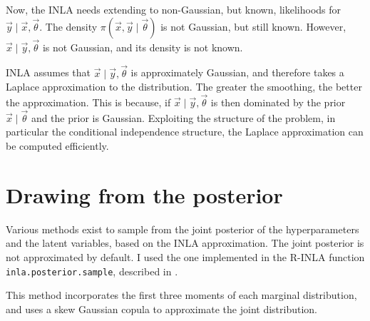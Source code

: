 \documentclass[thesis.tex]{subfiles}
\begin{document}
Now, the INLA needs extending to non-Gaussian, but known, likelihoods for $\vec{y} \mid \vec{x}, \vec{\theta}$.
The density $\pi(\vec{x}, \vec{y} \mid \vec{\theta})$ is not Gaussian, but still known.
However, $\vec{x} \mid \vec{y}, \vec{\theta}$ is not Gaussian, and its density is not known.

INLA assumes that $\vec{x} \mid \vec{y}, \vec{\theta}$ is approximately Gaussian, and therefore takes a Laplace approximation to the distribution.
The greater the smoothing, the better the approximation.
This is because, if $\vec{x} \mid \vec{y}, \vec{\theta}$ is then dominated by the prior $\vec{x} \mid \vec{\theta}$ and the prior is Gaussian.
Exploiting the structure of the problem, in particular the conditional independence structure, the Laplace approximation can be computed efficiently.

\section{Drawing from the posterior} \label{transmission:sec:INLA:posterior}

Various methods exist to sample from the joint posterior of the hyperparameters and the latent variables, based on the INLA approximation.
The joint posterior is not approximated by default.
I used the one implemented in the R-INLA function \texttt{inla.posterior.sample}, described in \textcite[section 4]{chiuchioloJoint}.

This method incorporates the first three moments of each marginal distribution, and uses a skew Gaussian copula to approximate the joint distribution.
\end{document}
